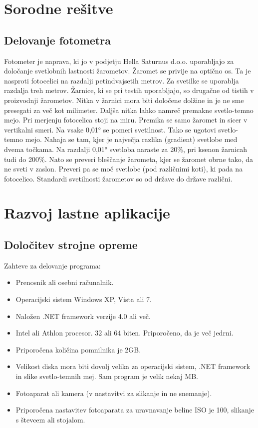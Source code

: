 \documentclass[oneside, a4paper, 12pt]{book}
\begin{document}
\chapter{Sorodne rešitve}
\section{Delovanje fotometra}
Fotometer je naprava, ki jo v podjetju Hella Saturnus d.o.o. uporabljajo za določanje svetlobnih lastnosti žarometov. Žaromet se privije na optično os. Ta je nasproti fotocelici na razdalji petindvajsetih metrov. Za svetilke se uporablja razdalja treh metrov. Žarnice, ki se pri testih uporabljajo, so drugačne od tistih v proizvodnji žarometov. Nitka v žarnici mora biti določene dolžine in je ne sme presegati za več kot milimeter. Daljša nitka lahko namreč premakne svetlo-temno mejo. Pri merjenju fotocelica stoji na miru. Premika se samo žaromet in sicer v vertikalni smeri. Na vsake 0,01° se pomeri svetilnost. Tako se ugotovi svetlo-temno mejo. Nahaja se tam, kjer je največja razlika (gradient) svetlobe med dvema točkama. Na razdalji 0,01° svetloba naraste za 20\%, pri ksenon žarnicah tudi do 200\%. Nato se preveri bleščanje žarometa, kjer se žaromet obrne tako, da ne sveti v zaslon. Preveri pa se moč svetlobe (pod različnimi koti), ki pada na fotocelico. Standardi svetilnosti žarometov so od države do države različni. 

\chapter{Razvoj lastne aplikacije}
\section{Določitev strojne opreme}
Zahteve za delovanje programa:
\begin{itemize}
\item Prenosnik ali osebni računalnik.
\item Operacijski sistem Windows XP, Vista ali 7.
\item Naložen .NET framework verzije 4.0 ali več.
\item Intel ali Athlon procesor. 32 ali 64 biten. Priporočeno, da je več jedrni.
\item Priporočena količina pomnilnika je 2GB.
\item Velikost diska mora biti dovolj velika za operacijski sistem, .NET framework in slike svetlo-temnih mej. Sam program je velik nekaj MB. 
\item Fotoaparat ali kamera (v nastavitvi za slikanje in ne snemanje).
\item Priporočena nastavitev fotoaparata za uravnavanje beline ISO je 100, slikanje s števcem ali stojalom.
\end{itemize}
\end{document}
